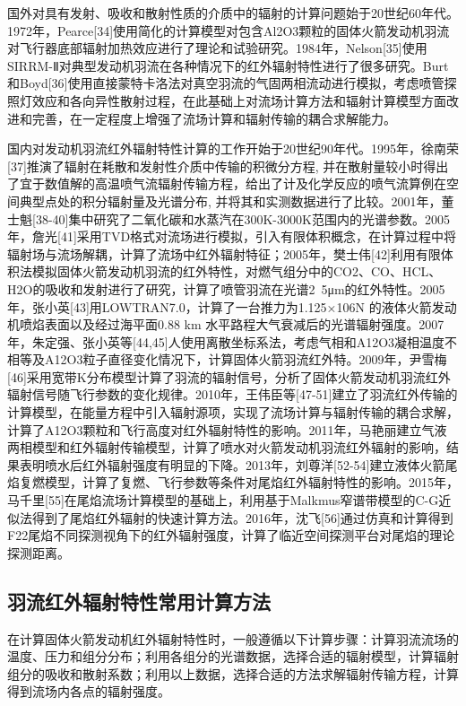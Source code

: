 国外对具有发射、吸收和散射性质的介质中的辐射的计算问题始于20世纪60年代。1972年，Pearce[34]使用简化的计算模型对包含Al2O3颗粒的固体火箭发动机羽流对飞行器底部辐射加热效应进行了理论和试验研究。1984年，Nelson[35]使用SIRRM-Ⅱ对典型发动机羽流在各种情况下的红外辐射特性进行了很多研究。Burt和Boyd[36]使用直接蒙特卡洛法对真空羽流的气固两相流动进行模拟，考虑喷管探照灯效应和各向异性散射过程，在此基础上对流场计算方法和辐射计算模型方面改进和完善，在一定程度上增强了流场计算和辐射传输的耦合求解能力。

国内对发动机羽流红外辐射特性计算的工作开始于20世纪90年代。1995年，徐南荣[37]推演了辐射在耗散和发射性介质中传输的积微分方程, 并在散射量较小时得出了宜于数值解的高温喷气流辐射传输方程，给出了计及化学反应的喷气流算例在空间典型点处的积分辐射量及光谱分布, 并将其和实测数据进行了比较。2001年，董士魁[38-40]集中研究了二氧化碳和水蒸汽在300K-3000K范围内的光谱参数。2005年，詹光[41]采用TVD格式对流场进行模拟，引入有限体积概念，在计算过程中将辐射场与流场解耦，计算了流场中红外辐射特征；2005年，樊士伟[42]利用有限体积法模拟固体火箭发动机羽流的红外特性，对燃气组分中的CO2、CO、HCL、H2O的吸收和发射进行了研究，计算了喷管羽流在光谱2~5μm的红外特性。2005年，张小英[43]用LOWTRAN7.0，计算了一台推力为1.125×106N 的液体火箭发动机喷焰表面以及经过海平面0.88 km 水平路程大气衰减后的光谱辐射强度。2007年，朱定强、张小英等[44,45]人使用离散坐标系法，考虑气相和A12O3凝相温度不相等及A12O3粒子直径变化情况下，计算固体火箭羽流红外特。2009年，尹雪梅[46]采用宽带K分布模型计算了羽流的辐射信号，分析了固体火箭发动机羽流红外辐射信号随飞行参数的变化规律。2010年，王伟臣等[47-51]建立了羽流红外传输的计算模型，在能量方程中引入辐射源项，实现了流场计算与辐射传输的耦合求解，计算了A12O3颗粒和飞行高度对红外辐射特性的影响。2011年，马艳丽建立气液两相模型和红外辐射传输模型，计算了喷水对火箭发动机羽流红外辐射的影响，结果表明喷水后红外辐射强度有明显的下降。2013年，刘尊洋[52-54]建立液体火箭尾焰复燃模型，计算了复燃、飞行参数等条件对尾焰红外辐射特性的影响。2015年，马千里[55]在尾焰流场计算模型的基础上，利用基于Malkmus窄谱带模型的C-G近似法得到了尾焰红外辐射的快速计算方法。2016年，沈飞[56]通过仿真和计算得到F22尾焰不同探测视角下的红外辐射强度，计算了临近空间探测平台对尾焰的理论探测距离。

\subsection{羽流红外辐射特性常用计算方法}
在计算固体火箭发动机红外辐射特性时，一般遵循以下计算步骤：计算羽流流场的温度、压力和组分分布；利用各组分的光谱数据，选择合适的辐射模型，计算辐射组分的吸收和散射系数；利用以上数据，选择合适的方法求解辐射传输方程，计算得到流场内各点的辐射强度。

